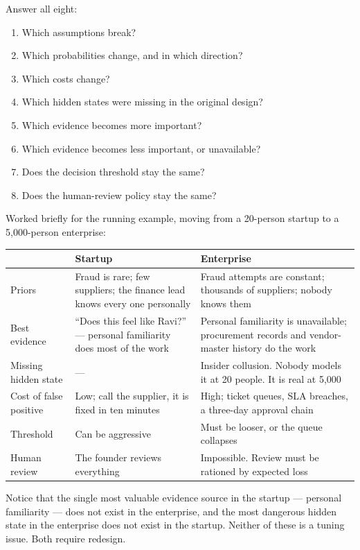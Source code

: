 \documentclass[11pt,a4paper]{article}
\begin{document}
Answer all eight:

\begin{enumerate}
  \item Which assumptions break?
  \item Which probabilities change, and in which direction?
  \item Which costs change?
  \item Which hidden states were missing in the original design?
  \item Which evidence becomes more important?
  \item Which evidence becomes less important, or unavailable?
  \item Does the decision threshold stay the same?
  \item Does the human-review policy stay the same?
\end{enumerate}

Worked briefly for the running example, moving from a 20-person startup to a 5{,}000-person
enterprise:

\begin{center}
\small
\begin{tabular}{@{}L{3.4cm}L{5.3cm}L{5.3cm}@{}}
\toprule
& \textbf{Startup} & \textbf{Enterprise} \\
\midrule
Priors & Fraud is rare; few suppliers; the finance lead knows every one personally & Fraud attempts are constant; thousands of suppliers; nobody knows them \\[3pt]
Best evidence & ``Does this feel like Ravi?'' --- personal familiarity does most of the work & Personal familiarity is unavailable; procurement records and vendor-master history do the work \\[3pt]
Missing hidden state & --- & Insider collusion. Nobody models it at 20 people. It is real at 5{,}000 \\[3pt]
Cost of false positive & Low; call the supplier, it is fixed in ten minutes & High; ticket queues, SLA breaches, a three-day approval chain \\[3pt]
Threshold & Can be aggressive & Must be looser, or the queue collapses \\[3pt]
Human review & The founder reviews everything & Impossible. Review must be rationed by expected loss \\
\bottomrule
\end{tabular}
\end{center}

Notice that the single most valuable evidence source in the startup --- personal familiarity ---
does not exist in the enterprise, and the most dangerous hidden state in the enterprise does not
exist in the startup. Neither of these is a tuning issue. Both require redesign.
\end{document}
